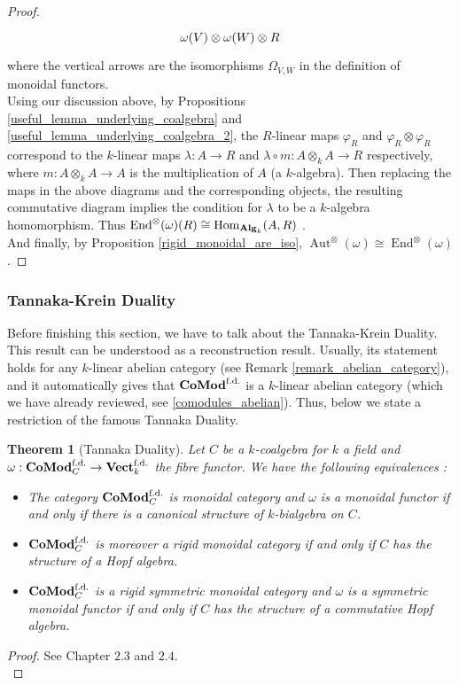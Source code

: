 \documentclass{article}
\theoremstyle{plain}
\newtheorem{theorem}{Theorem}[subsection]
\theoremstyle{definition}
\DeclareMathOperator{\Hom}{Hom}
\DeclareMathOperator{\Aut}{Aut}
\DeclareMathOperator{\End}{End}
\DeclareMathOperator{\Alg}{\bf{Alg}}
\DeclareMathOperator{\Vect}{\bf{Vect}}
\DeclareMathOperator{\Comod}{\bf{CoMod}}
\begin{document}
\begin{proof}
\[\begin{tikzcd}
        \omega(V)\otimes\omega(W)\otimes R
    \end{tikzcd}
    \]
    where the vertical arrows are the isomorphisms $\Omega_{V,W}$ in the definition of monoidal functors.\\
    Using our discussion above, by Propositions \ref{useful_lemma_underlying_coalgebra} and \ref{useful_lemma_underlying_coalgebra_2}, the $R$-linear maps $\varphi_R$ and $\varphi_R\otimes \varphi_R$ correspond to the $k$-linear maps $\lambda:A\rightarrow R$ and $\lambda\circ m: A\otimes_kA\rightarrow R$ respectively, where $m:A\otimes_kA\rightarrow A$ is the multiplication of $A$ (a $k$-algebra).
    Then replacing the maps in the above diagrams and the corresponding objects, the resulting commutative diagram implies the condition for $\lambda$ to be a $k$-algebra homomorphism.
    Thus $\End^{\otimes}(\omega)(R) \cong \Hom_{\Alg_k}(A,R)$ .\\
    And finally, by Proposition \ref{rigid_monoidal_are_iso}, $\Aut^{\otimes}(\omega) \cong \End^{\otimes}(\omega)$.
\end{proof}

\subsubsection{Tannaka-Krein Duality}

Before finishing this section, we have to talk about the Tannaka-Krein Duality.
This result can be understood as a reconstruction result. 
Usually, its statement holds for any $k$-linear abelian category (see Remark \ref{remark_abelian_category}), and it automatically gives that $\Comod^{\text{f.d.}}$ is a $k$-linear abelian category (which we have already reviewed, see \ref{comodules_abelian}). Thus, below we state a restriction of the famous Tannaka Duality.

\begin{theorem}[Tannaka Duality]
\label{Tannaka_duality}
    Let $C$ be a $k$-coalgebra for $k$ a field and $\omega:\Comod^{\text{f.d.}}_C\rightarrow \Vect^{\text{f.d.}}_k$ the fibre functor. We have the following equivalences :
    \begin{itemize}
        \item[$a)$] The category $\Comod^{\text{f.d.}}_C$ is monoidal category and $\omega$ is a monoidal functor if and only if there is a canonical structure of $k$-bialgebra on $C$.
        \item[$b)$] $\Comod^{\text{f.d.}}_C$ is moreover a rigid monoidal category if and only if $C$ has the structure of a Hopf algebra.
        \item[$c)$] $\Comod_C^{\text{f.d.}}$ is a rigid symmetric monoidal category and $\omega$ is a  symmetric monoidal functor if and only if $C$ has the structure of a commutative Hopf algebra.
    \end{itemize}
\end{theorem}
\begin{proof}
    See \cite{Schauenburg} Chapter $2.3$ and $2.4$.\\ 
\end{proof}
\end{document}
